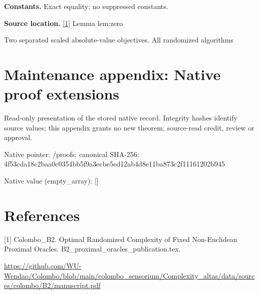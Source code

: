 \documentclass[10pt,a4paper]{article}
\begin{document}
\textbf{Constants.} Exact equality; no suppressed constants.



\textbf{Source location.} \href{https://github.com/WU-Wendao/Colombo/blob/main/colombo_sensorium/Complexity_altas/data/sources/colombo/B2/manuscript.pdf}{[1]} Lemma lem:zero



Two separated scaled absolute-value objectives. All randomized algorithms



\section{Maintenance appendix: Native proof extensions}


Read-only presentation of the stored native record. Integrity hashes identify source values; this appendix grants no new theorem, source-read credit, review or approval.



Native pointer: /proofs; canonical SHA-256: 4f53cda18c2baa0c0354bb5f\allowbreak{}9a3ecbe5ed12ab4d8e11ba87\allowbreak{}3c2f11161202b945



Native value (empty\_array): []



\section{References}


[1] Colombo\_B2. Optimal Randomized Complexity of Fixed Non-Euclidean Proximal Oracles. B2\_proximal\_oracles\_publication.tex.



\url{https://github.com/WU-Wendao/Colombo/blob/main/colombo_sensorium/Complexity_altas/data/sources/colombo/B2/manuscript.pdf}
\end{document}
